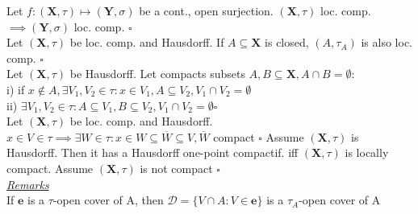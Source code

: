Let $f:(\mathbf{X},\tau)\mapsto(\mathbf{Y},\sigma)$ be a cont., open surjection. $(\mathbf{X},\tau)$ loc. comp. $\implies(\mathbf{Y},\sigma)$ loc. comp. $\square$\\
Let $(\mathbf{X},\tau)$ be loc. comp. and Hausdorff. If $A\subseteq\mathbf{X}$ is closed, $(A,\tau_A)$ is also loc. comp. $\square$\\
Let $(\mathbf{X},\tau)$ be Hausdorff. Let compacts subsets $A,B\subseteq\mathbf{X},A\cap B=\emptyset$: \\
i) if $x\notin A,\exists V_1,V_2\in\tau:x\in V_1,A\subseteq V_2,V_1\cap V_2=\emptyset$\\
ii) $\exists V_1,V_2\in\tau:A\subseteq V_1,B\subseteq V_2, V_1\cap V_2=\emptyset \square$\\
Let $(\mathbf{X},\tau)$ be loc. comp. and Hausdorff. $x\in V\in\tau\implies\exists W\in\tau:x\in W\subseteq\overline{W}\subseteq V, \overline{W}$ compact $\square$
Assume $(\mathbf{X},\tau)$ is Hausdorff. Then it has a Hausdorff one-point compactif. iff $(\mathbf{X},\tau)$ is locally compact. Assume $(\mathbf{X},\tau)$ is not compact $\square$
\\\underline{\emph{Remarks}}\\
If $\mathbf{e}$ is a $\tau$-open cover of A, then $\mathcal{D}=\{V\cap A:V\in\mathbf{e}\}$ is a $\tau_A$-open cover of A
